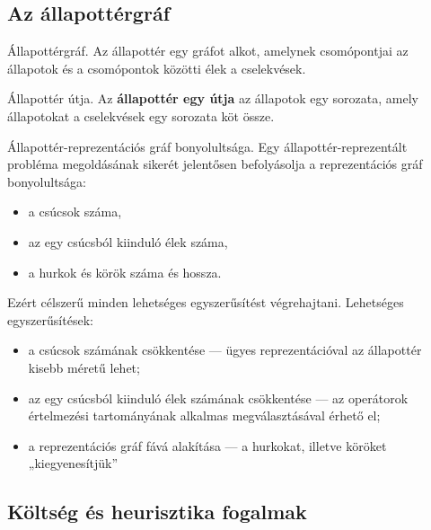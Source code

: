 \subsection{Az állapottérgráf}

\begin{definicio}
    Állapottérgráf.
    Az állapottér egy gráfot alkot,
    amelynek csomópontjai az állapotok és a csomópontok közötti élek a
    cselekvések.


\end{definicio}

\begin{definicio}
    Állapottér útja.
    Az \textbf{állapottér egy útja} az állapotok egy sorozata, amely
    állapotokat a cselekvések egy sorozata köt össze.
\end{definicio}

\begin{definicio}
    Állapottér-reprezentációs gráf bonyolultsága.  Egy állapottér-reprezentált
    probléma megoldásának sikerét jelentősen befolyásolja a reprezentációs gráf
    bonyolultsága:

    \begin{itemize}
        \item a csúcsok száma,
        \item az egy csúcsból kiinduló élek száma,
        \item a hurkok és körök száma és hossza.
    \end{itemize}

    Ezért célszerű minden lehetséges egyszerűsítést végrehajtani. Lehetséges
    egyszerűsítések:

    \begin{itemize}
        \item a csúcsok számának csökkentése — ügyes reprezentációval az
            állapottér kisebb méretű lehet;
        \item az egy csúcsból kiinduló élek számának csökkentése — az
            operátorok értelmezési tartományának alkalmas megválasztásával
            érhető el;
        \item a reprezentációs gráf fává alakítása — a hurkokat, illetve
            köröket „kiegyenesítjük”
    \end{itemize}
\end{definicio}


\subsection{Költség és heurisztika fogalmak}

